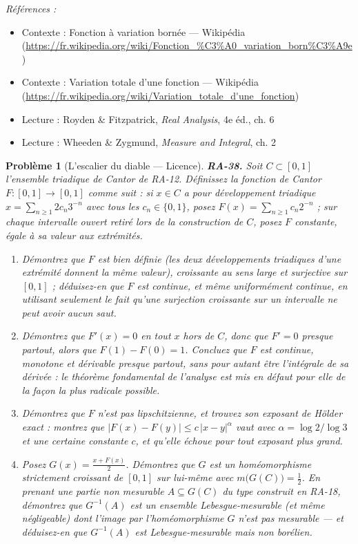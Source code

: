 \documentclass[11pt]{article}
\newtheorem{problem}{Problème}
\newenvironment{refs}{\par\small\noindent\emph{Références :}\begin{itemize}\setlength\itemsep{0pt}}{\end{itemize}\normalsize}
\begin{document}
\begin{refs}
\item Contexte : Fonction à variation bornée --- Wikipédia (\url{https://fr.wikipedia.org/wiki/Fonction_%C3%A0_variation_born%C3%A9e})
\item Contexte : Variation totale d'une fonction --- Wikipédia (\url{https://fr.wikipedia.org/wiki/Variation_totale_d'une_fonction})
\item Lecture : Royden \& Fitzpatrick, \textit{Real Analysis}, 4e éd., ch. 6
\item Lecture : Wheeden \& Zygmund, \textit{Measure and Integral}, ch. 2
\end{refs}

\bigskip

\begin{problem}[{L'escalier du diable --- Licence}]
\textbf{RA-38.} Soit $ C \subset [0,1] $ l'ensemble triadique de Cantor de RA-12. Définissez
la fonction de Cantor $ F : [0,1] \to [0,1] $ comme suit : si $ x \in C $ a pour développement
triadique $ x = \sum_{n\ge1} 2c_n 3^{-n} $ avec tous les $ c_n \in \{0,1\} $, posez
$ F(x) = \sum_{n\ge1} c_n 2^{-n} $ ; sur chaque intervalle ouvert retiré lors de la construction
de $ C $, posez $ F $ constante, égale à sa valeur aux extrémités.
\begin{enumerate}
\item[(a)] Démontrez que $ F $ est bien définie (les deux développements triadiques d'une extrémité
donnent la même valeur), croissante au sens large et surjective sur $ [0,1] $ ; déduisez-en que
$ F $ est continue, et même uniformément continue, en utilisant seulement le fait qu'une
surjection croissante sur un intervalle ne peut avoir aucun saut.
\item[(b)] Démontrez que $ F'(x) = 0 $ en tout $ x $ hors de $ C $, donc que $ F' = 0 $ presque
partout, alors que $ F(1)-F(0) = 1 $. Concluez que $ F $ est continue, monotone et dérivable
presque partout, sans pour autant être l'intégrale de sa dérivée : le théorème fondamental de
l'analyse est mis en défaut pour elle de la façon la plus radicale possible.
\item[(c)] Démontrez que $ F $ n'est pas lipschitzienne, et trouvez son exposant de Hölder exact :
montrez que $ |F(x)-F(y)| \le c\,|x-y|^{\alpha} $ vaut avec $ \alpha = \log 2/\log 3 $ et une
certaine constante $ c $, et qu'elle échoue pour tout exposant plus grand.
\item[(d)] Posez $ G(x) = \frac{x + F(x)}{2} $. Démontrez que $ G $ est un homéomorphisme strictement
croissant de $ [0,1] $ sur lui-même avec $ m\big(G(C)\big) = \tfrac12 $. En prenant une partie
non mesurable $ A \subseteq G(C) $ du type construit en RA-18, démontrez que $ G^{-1}(A) $ est
un ensemble Lebesgue-mesurable (et même négligeable) dont l'image par l'homéomorphisme $ G $ n'est
pas mesurable --- et déduisez-en que $ G^{-1}(A) $ est Lebesgue-mesurable mais non borélien.
\end{enumerate}

\end{problem}
\end{document}
